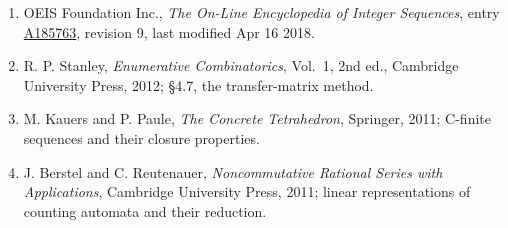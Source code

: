\documentclass[11pt]{article}
\theoremstyle{definition}
\begin{document}
\begin{enumerate}

\item OEIS Foundation Inc., \emph{The On-Line Encyclopedia of Integer Sequences}, entry \href{https://oeis.org/A185763}{A185763}, revision 9, last modified Apr 16 2018.

\item R. P. Stanley, \emph{Enumerative Combinatorics}, Vol.~1, 2nd ed., Cambridge University Press, 2012; \S4.7, the transfer-matrix method.

\item M. Kauers and P. Paule, \emph{The Concrete Tetrahedron}, Springer, 2011; C-finite sequences and their closure properties.

\item J. Berstel and C. Reutenauer, \emph{Noncommutative Rational Series with Applications}, Cambridge University Press, 2011; linear representations of counting automata and their reduction.

\end{enumerate}
\end{document}
